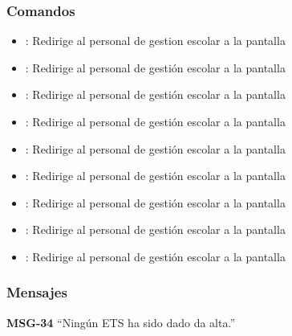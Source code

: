 \subsubsection{Comandos}
\begin{itemize}
    \item {}: Redirige al personal de gestion escolar a la pantalla 
    
    \item {}: Redirige al personal de gestión escolar a la pantalla 
    \item {}: Redirige al personal de gestión escolar a la pantalla 
    
    \item {}: Redirige al personal de gestión escolar a la pantalla 
    \item {}: Redirige al personal de gestión escolar a la pantalla 
    
    \item {}: Redirige al personal de gestión escolar a la pantalla 
    \item {}: Redirige al personal de gestión escolar a la pantalla 
    
    \item {}: Redirige al personal de gestión escolar a la pantalla 
    \item {}: Redirige al personal de gestión escolar a la pantalla 
\end{itemize}

\subsubsection{Mensajes}

\begin{Citemize}
    \item {\bf MSG-34}  ``Ningún ETS ha sido dado da alta.''
\end{Citemize}

